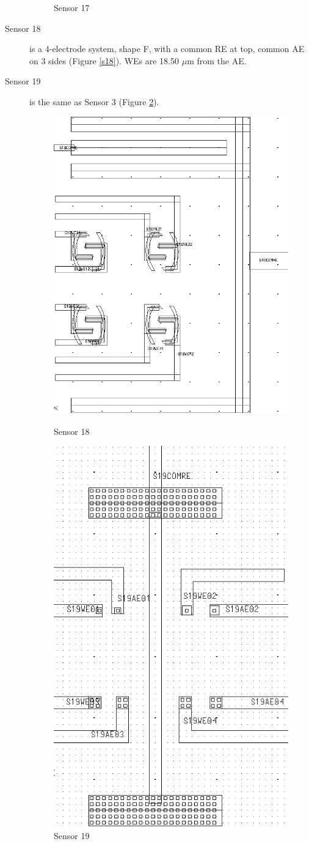 \begin{description}
\begin{figure}
\begin{minipage}{0.5\linewidth}
		\caption{Sensor 17}
		\label{s17}
	\end{minipage}
\end{figure}

\item[Sensor 18] is a 4-electrode system, shape F, with a common RE at top, common AE on 3 sides (Figure \ref{s18}). WEs are 18.50 $\mu \mathrm{m}$ from the AE.
\item[Sensor 19] is the same as Sensor 3 (Figure \ref{s19}).

\begin{figure}
	\begin{minipage}{0.5\linewidth}
		\centering
		\includegraphics[width=0.6\linewidth]{figures/s18.png}
		\caption{Sensor 18}
		\label{s18}
	\end{minipage}
	\begin{minipage}{0.5\linewidth}
		\centering
		\includegraphics[width=0.6\linewidth]{figures/s19.png}
		\caption{Sensor 19}
		\label{s19}
	\end{minipage}
\end{figure}


\end{description}

